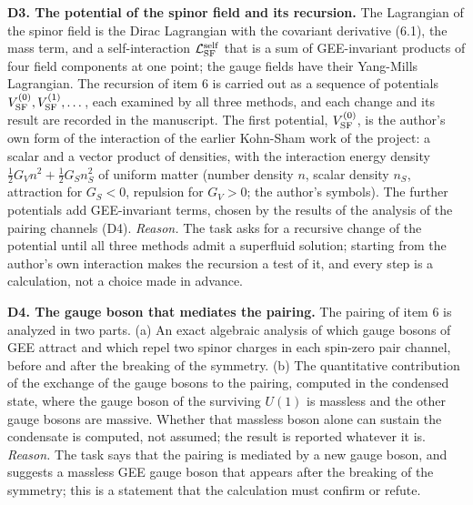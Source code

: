 \documentclass[
  10pt,
]{article}
\begin{document}
\textbf{D3. The potential of the spinor field and its recursion.} The
Lagrangian of the spinor field is the Dirac Lagrangian with the
covariant derivative (6.1), the mass term, and a self-interaction
\(\mathcal L^{\rm self}_{\rm SF}\) that is a sum of GEE-invariant
products of four field components at one point; the gauge fields have
their Yang-Mills Lagrangian. The recursion of item 6 is carried out as a
sequence of potentials \(V^{(0)}_{\rm SF},V^{(1)}_{\rm SF},\dots\), each
examined by all three methods, and each change and its result are
recorded in the manuscript. The first potential, \(V^{(0)}_{\rm SF}\),
is the author's own form of the interaction of the earlier Kohn-Sham
work of the project: a scalar and a vector product of densities, with
the interaction energy density \(\tfrac12G_Vn^2+\tfrac12G_Sn_S^2\) of
uniform matter (number density \(n\), scalar density \(n_S\), attraction
for \(G_S<0\), repulsion for \(G_V>0\); the author's symbols). The
further potentials add GEE-invariant terms, chosen by the results of the
analysis of the pairing channels (D4). \emph{Reason.} The task asks for
a recursive change of the potential until all three methods admit a
superfluid solution; starting from the author's own interaction makes
the recursion a test of it, and every step is a calculation, not a
choice made in advance.

\textbf{D4. The gauge boson that mediates the pairing.} The pairing of
item 6 is analyzed in two parts. (a) An exact algebraic analysis of
which gauge bosons of GEE attract and which repel two spinor charges in
each spin-zero pair channel, before and after the breaking of the
symmetry. (b) The quantitative contribution of the exchange of the gauge
bosons to the pairing, computed in the condensed state, where the gauge
boson of the surviving \(U(1)\) is massless and the other gauge bosons
are massive. Whether that massless boson alone can sustain the
condensate is computed, not assumed; the result is reported whatever it
is. \emph{Reason.} The task says that the pairing is mediated by a new
gauge boson, and suggests a massless GEE gauge boson that appears after
the breaking of the symmetry; this is a statement that the calculation
must confirm or refute.
\end{document}
